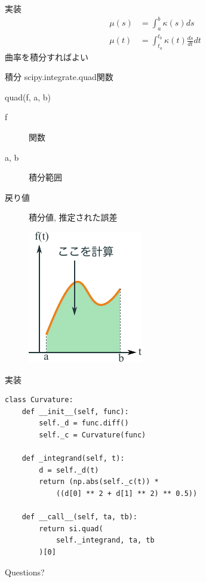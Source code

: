 \documentclass[12pt, xetex, xcolor=pdftex, dvipsnames]{beamer}
\begin{document}
\begin{frame}{実装}
  \begin{align}
      \mu(s) &= \int_a^b \kappa(s)ds\\
      \mu(t) &= \int_{t_a}^{t_b} \kappa(t) \frac{ds}{dt}dt
  \end{align}
  曲率を積分すればよい
\end{frame}
\begin{frame}{積分}
  scipy.integrate.quad関数
  \begin{minipage}{0.5\hsize}
      \begin{block}{quad(f, a, b)}
          \begin{description}
              \item[f] 関数
              \item[a, b] 積分範囲
              \item[戻り値] 積分値, 推定された誤差
          \end{description}
      \end{block}
  \end{minipage}\begin{minipage}{0.5\hsize}
      \begin{figure}
          \centering
          \includegraphics[width=0.8\hsize]{img/integ.pdf}
      \end{figure}
  \end{minipage}
\end{frame}
\begin{frame}[fragile]{実装}
\begin{lstlisting}
class Curvature:
    def __init__(self, func):
        self._d = func.diff()
        self._c = Curvature(func)

    def _integrand(self, t):
        d = self._d(t)
        return (np.abs(self._c(t)) *
            ((d[0] ** 2 + d[1] ** 2) ** 0.5))

    def __call__(self, ta, tb):
        return si.quad(
            self._integrand, ta, tb
        )[0]
\end{lstlisting}
\end{frame}

\begin{frame}[standout]
  Questions?
\end{frame}
\end{document}
